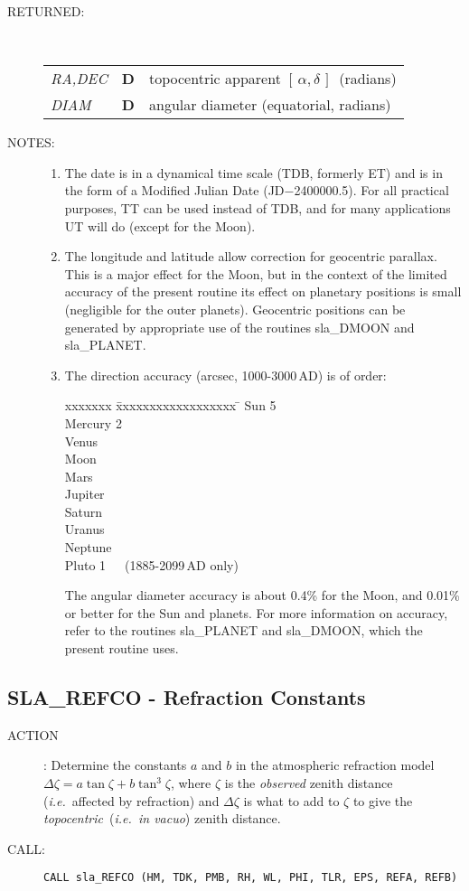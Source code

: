 \documentclass[11pt,twoside]{article}
\newcommand{\xlabel}[1]{}
\newcommand{\radec}     {$[\,\alpha,\delta\,]$}
\newcommand{\routine}[3]
{\hbadness=10000
  \vbox
  {
    \rule{\textwidth}{0.3mm}\\
    {\Large {\bf #1} \hfill #2 \hfill {\bf #1}}\\
    \setlength{\oldspacing}{\topsep}
    \setlength{\topsep}{0.3ex}
    \begin{description}
      #3
    \end{description}
    \setlength{\topsep}{\oldspacing}
  }
}
\renewcommand{\routine}[3]
   {
      \subsection{#1\xlabel{#1} - #2\label{#1}}
       \begin{description}
         #3
       \end{description}
   }
\newcommand{\action}[1]
{\item[ACTION]: #1}
\newcommand{\action}[1]
   {\item[ACTION:] #1}
\newcommand{\call}[1]
{\item[CALL]: \hspace{0.4em}{\tt #1}}
\newlength{\oldspacing}
\renewcommand{\call}[1]
   {
    \item[CALL:] {\tt #1}
   }
\newcommand{\args}[2]
{
  \goodbreak
  \setlength{\oldspacing}{\topsep}
  \setlength{\topsep}{0.3ex}
  \begin{description}
  \item[#1]:\\[1.5ex]
    \begin{tabular}{p{7em}p{6em}p{22em}}
      #2
    \end{tabular}
  \end{description}
  \setlength{\topsep}{\oldspacing}
}
\renewcommand{\args}[2]
   {
     \begin{description}
        \item[#1:]\\
        \begin{tabular}{p{7em}p{6em}l}
           #2
        \end{tabular}
     \end{description}
   }
\newcommand{\spec}[3]
{
  {\em {#1}} & {\bf \mbox{#2}} & {#3}
}
\newcommand{\notes}[1]
{
  \goodbreak
  \setlength{\oldspacing}{\topsep}
  \setlength{\topsep}{0.3ex}
  \begin{description}
    \item[NOTES]:
        #1
  \end{description}
  \setlength{\topsep}{\oldspacing}
}
\renewcommand{\notes}[1]
   {
      \begin{description}
         \item[NOTES:]
            #1
      \end{description}
   }
\begin{document}
\args{RETURNED}
{
 \spec{RA,DEC}{D}{topocentric apparent \radec\ (radians)} \\
 \spec{DIAM}{D}{angular diameter (equatorial, radians)}
}
\notes
{
 \begin{enumerate}
  \item The date is in a dynamical time scale (TDB, formerly ET)
        and is in the form of a Modified
        Julian Date (JD$-$2400000.5).  For all practical purposes, TT can
        be used instead of TDB, and for many applications UT will do
        (except for the Moon).
  \item The longitude and latitude allow correction for geocentric
        parallax.  This is a major effect for the Moon, but in the
        context of the limited accuracy of the present routine its
        effect on planetary positions is small (negligible for the
        outer planets).  Geocentric positions can be generated by
        appropriate use of the routines sla\_DMOON and sla\_PLANET.
  \item The direction accuracy (arcsec, 1000-3000\,AD) is of order:
        \begin{tabbing}
         xxxxxxx \= xxxxxxxxxxxxxxxxxx \= \kill
         \> Sun     \>  \hspace{0.5em}5 \\
         \> Mercury \>  \hspace{0.5em}2 \\
         \> Venus   \> 10 \\
         \> Moon    \> 30 \\
         \> Mars    \> 50 \\
         \> Jupiter \> 90 \\
         \> Saturn  \> 90 \\
         \> Uranus  \> 90 \\
         \> Neptune \> 10 \\
         \> Pluto \> \hspace{0.5em}1~~~(1885-2099\,AD only)
        \end{tabbing}
        The angular diameter accuracy is about 0.4\% for the Moon,
        and 0.01\% or better for the Sun and planets.
        For more information on accuracy,
        refer to the routines sla\_PLANET and sla\_DMOON,
        which the present routine uses.
 \end{enumerate}
}
\routine{SLA\_REFCO}{Refraction Constants}
{
 \action{Determine the constants $a$ and $b$ in the
         atmospheric refraction model
         $\Delta \zeta = a \tan \zeta + b \tan^{3} \zeta$,
         where $\zeta$ is the {\it observed}\/ zenith distance
         ({\it i.e.}\ affected by refraction) and $\Delta \zeta$ is
         what to add to $\zeta$ to give the {\it topocentric}\,
         ({\it i.e.\ in vacuo}) zenith distance.}
 \call{CALL sla\_REFCO (HM, TDK, PMB, RH, WL, PHI, TLR, EPS, REFA, REFB)}
}
\end{document}
